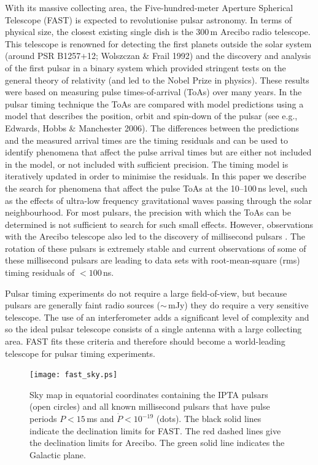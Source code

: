 \documentclass{raa}            %
\begin{document}
With its massive collecting area, the Five-hundred-meter Aperture Spherical Telescope (FAST) is expected to revolutionise pulsar astronomy.  In terms of physical size, the closest existing single dish is the 300\,m Arecibo radio telescope. This telescope is renowned for detecting the first planets outside the solar system (around PSR B1257$+$12; Wolszczan \& Frail 1992\nocite{wf92}) and the discovery and analysis of the first pulsar in a binary system \citep{ht75} which provided stringent tests on the general theory of relativity (and led to the Nobel Prize in physics).   These results were based on measuring pulse times-of-arrival (ToAs) over many years. In the pulsar timing technique the ToAs are compared with model predictions using a model that describes the position, orbit and spin-down of the pulsar (see e.g., Edwards, Hobbs \& Manchester 2006\nocite{ehm06}).   The differences between the predictions and the measured arrival times are the timing residuals and can be used to identify phenomena that affect the pulse arrival times but are either not included in the model, or not included with sufficient precision. The timing model is iteratively updated in order to minimise the residuals.  In this paper we describe the search for phenomena that affect the pulse ToAs at the 10--100\,ns level, such as the effects of ultra-low frequency gravitational waves passing through the solar neighbourhood.  For most pulsars, the precision with which the ToAs can be determined is not sufficient to search for such small effects.  However, observations with the Arecibo telescope also led to the discovery of millisecond pulsars \citep{bkh+82}.  The rotation of these pulsars is extremely stable and current observations of some of these millisecond pulsars are leading to data sets with root-mean-square (rms) timing residuals of $<100$\,ns.

Pulsar timing experiments do not require a large field-of-view, but because pulsars are generally faint radio sources ($\sim$\,mJy) they do require a very sensitive telescope.  The use of an interferometer adds a significant level of complexity and so the ideal pulsar telescope consists of a single antenna with a large collecting area. FAST fits these criteria and therefore should become a world-leading telescope for pulsar timing experiments.  

\begin{figure}
\texttt{[image: fast\_sky.ps]}
\caption{Sky map in equatorial coordinates containing the IPTA pulsars (open circles) and all known millisecond pulsars that have pulse periods $P < 15$\,ms and $\dot{P} < 10^{-19}$ (dots).  The black solid lines indicate the declination limits for FAST. The red dashed lines give the declination limits for Arecibo. The green solid line indicates the Galactic plane.}\label{fg:sky}
\end{figure}
\end{document}
